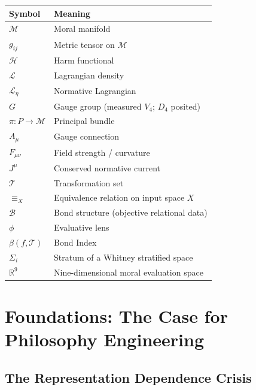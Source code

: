 \documentclass[12pt,letterpaper,twoside,openright]{book}
\theoremstyle{plain}
\theoremstyle{definition}
\theoremstyle{remark}
\newcommand{\R}{\mathbb{R}}
\newcommand{\calT}{\mathcal{T}}
\newcommand{\calB}{\mathcal{B}}
\newcommand{\calL}{\mathcal{L}}
\newcommand{\calM}{\mathcal{M}}
\newcommand{\calH}{\mathcal{H}}
\newcommand{\Lag}{\mathcal{L}}
\newcommand{\equivX}{\equiv_X}
\begin{document}
\begin{longtable}{lp{10cm}}
\toprule
\textbf{Symbol} & \textbf{Meaning} \\
\midrule
$\calM$ & Moral manifold \\
$g_{ij}$ & Metric tensor on $\calM$ \\
$\calH$ & Harm functional \\
$\calL$ & Lagrangian density \\
$\Lag_\eta$ & Normative Lagrangian \\
$G$ & Gauge group (measured $V_4$; $D_4$ posited) \\
$\pi: P \to \calM$ & Principal bundle \\
$A_\mu$ & Gauge connection \\
$F_{\mu\nu}$ & Field strength / curvature \\
$J^\mu$ & Conserved normative current \\
$\calT$ & Transformation set \\
$\equivX$ & Equivalence relation on input space $X$ \\
$\calB$ & Bond structure (objective relational data) \\
$\phi$ & Evaluative lens \\
$\beta(f, \calT)$ & Bond Index \\
$\Sigma_i$ & Stratum of a Whitney stratified space \\
$\R^9$ & Nine-dimensional moral evaluation space \\
\bottomrule
\end{longtable}

\mainmatter

\part{Foundations: The Case for Philosophy Engineering}
\label{part:foundations}

\chapter{The Representation Dependence Crisis}
\label{ch:crisis}
\end{document}
